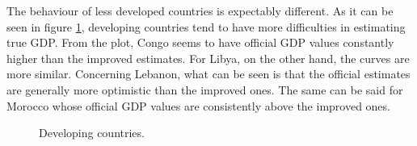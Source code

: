 The behaviour of less developed countries is expectably different. As it can be seen in figure \ref{fig:devcountries}, developing countries tend to have more difficulties in estimating true GDP.
From the plot, Congo seems to have official GDP values constantly higher than the improved estimates.
For Libya, on the other hand, the curves are more similar.
Concerning Lebanon, what can be seen is that the official estimates are generally more optimistic than the improved ones. The same can be said for Morocco whose official GDP values are consistently above the improved ones.

\begin{figure}
    \centering
    \hspace*{-2.8cm}
    \quad
    \hspace*{-2.8cm}
    \caption{Developing countries.}%
    \label{fig:devcountries}
\end{figure}

